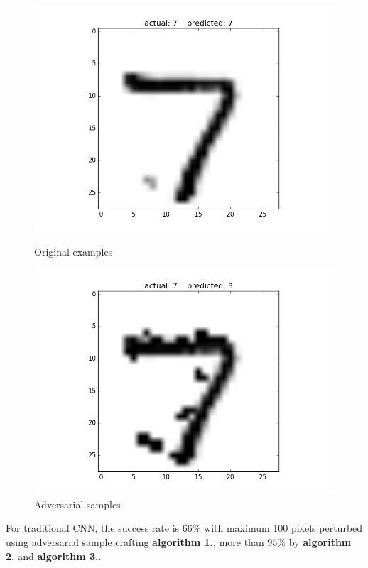 \documentclass{article}
\begin{document}
\begin{figure}[h!]
	\begin{minipage}{0.5\textwidth}
		\centering
		\includegraphics[width=\textwidth]{sample_original2.png}
		\caption{Original examples}
	\end{minipage} \hfill
	\begin{minipage}{0.5\textwidth}
		\centering
		\includegraphics[width=\textwidth]{sample_perturbed2.png}
		\caption{Adversarial samples}
	\end{minipage}
\end{figure}

For traditional CNN, the success rate is $66\%$ with maximum 100 pixels perturbed using adversarial sample crafting \textbf{algorithm 1.}, more than $95\%$ by \textbf{algorithm 2.} and \textbf{algorithm 3.}.
\end{document}
